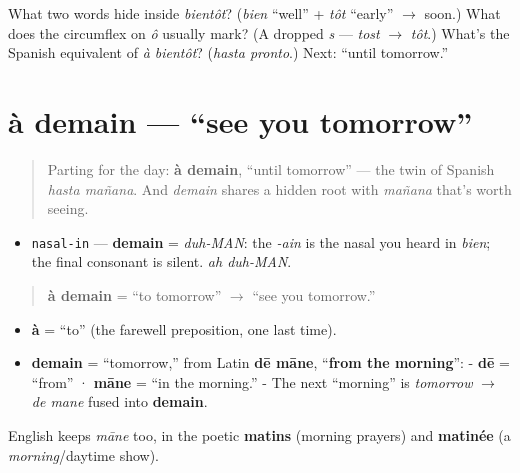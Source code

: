 \begin{tcolorbox}[breakable,colback=teal!4,colframe=teal!35!black,title={Before you move on}]
What two words hide inside \emph{bientôt}? (\emph{bien} \textquotedblleft{}well\textquotedblright{} + \emph{tôt} \textquotedblleft{}early\textquotedblright{} $\to$ soon.) What does the circumflex on \emph{ô} usually mark? (A dropped \emph{s} — \emph{tost} $\to$ \emph{tôt}.) What's the Spanish equivalent of \emph{à bientôt}? (\emph{hasta pronto}.) Next: \textquotedblleft{}until tomorrow.\textquotedblright{}
\end{tcolorbox}
\section[à demain]{à demain — \textquotedblleft{}see you tomorrow\textquotedblright{}}

\label{lesson:FR-C04-a-demain}



\begin{quote}
Parting for the day: \textbf{à demain}, \textquotedblleft{}until tomorrow\textquotedblright{} — the twin of Spanish \emph{hasta mañana}. And \emph{demain} shares a hidden root with \emph{mañana} that's worth seeing.
\end{quote}

\begin{sounds}
\begin{itemize}
\raggedright
  \item \texttt{nasal-in} — \textbf{demain} = \emph{duh-MAN}: the \emph{-ain} is the nasal you heard in \emph{bien}; the final consonant is silent. \emph{ah duh-MAN}.
\end{itemize}
\end{sounds}

\begin{cousinweb}
\begin{quote}
\textbf{à demain} = \textquotedblleft{}to tomorrow\textquotedblright{} $\to$ \textquotedblleft{}see you tomorrow.\textquotedblright{}
\end{quote}

\begin{itemize}
\raggedright
  \item \textbf{à} = \textquotedblleft{}to\textquotedblright{} (the farewell preposition, one last time).
  \item \textbf{demain} = \textquotedblleft{}tomorrow,\textquotedblright{} from Latin \textbf{dē māne}, \textquotedblleft{}\textbf{from the morning}\textquotedblright{}: - \textbf{dē} = \textquotedblleft{}from\textquotedblright{} · \textbf{māne} = \textquotedblleft{}in the morning.\textquotedblright{} - The next \textquotedblleft{}morning\textquotedblright{} is \emph{tomorrow} $\to$ \emph{de mane} fused into \textbf{demain}.
\end{itemize}

English keeps \emph{māne} too, in the poetic \textbf{matins} (morning prayers) and \textbf{matinée} (a \emph{morning}/daytime show).
\end{cousinweb}

